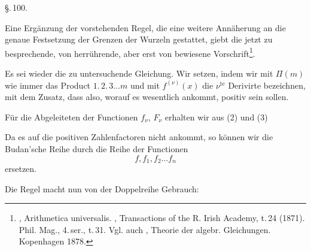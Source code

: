 
\begin{center}
\S.\,100.

\end{center}

Eine Ergänzung der vorstehenden Regel, die eine weitere Annäherung an
die genaue Festsetzung der Grenzen der Wurzeln gestattet, giebt die
jetzt zu besprechende, von  herrührende, aber erst von
 bewiesene Vorschrift\footnote{,
Arithmetica universalis. , Transactions of the
R. Irish Academy, t.\,24 (1871). Phil. Mag., 4.\,ser., t.\,31. Vgl. auch
, Theorie der algebr. Gleichungen. Kopenhagen 1878.}.

Es sei wieder
die zu untersuchende Gleichung. Wir setzen, indem wir mit $\Pi(m)$ wie
immer das Product $1.\,2.\,3 \ldots m$ und mit $f^{(\nu)}(x)$ die
$\nu^{\text{te}}$ Derivirte bezeichnen,
mit dem Zusatz, dass
also, worauf es wesentlich ankommt, positiv sein sollen.

Für die Abgeleiteten der Functionen $f_\nu$, $F_\nu$ erhalten wir aus
(2) und (3)

Da es auf die positiven Zahlenfactoren nicht ankommt, so können wir die
Budan'sche Reihe durch die Reihe der Functionen
\[
f, f_1, f_2 \ldots f_n
\]
ersetzen.

Die  Regel macht nun von der Doppelreihe Gebrauch:
